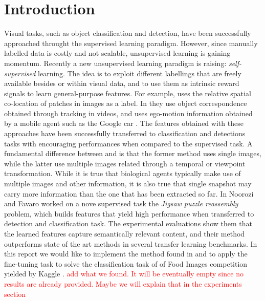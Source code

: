 \section{Introduction}
Visual tasks, such as object classification and detection, have been successfully approached throught the supervised learning paradigm. However, since manually labelled data is costly and not scalable, unsupervised learning is gaining momentum.\newline
Recently a new unsupervised learning paradigm is raising: \emph{self-supervised} learning. The idea is to exploit different labellings that are freely available besides or within visual data, and to use them as intrinsic reward signals to learn general-purpose features.
For example, \cite{context_prediction} uses the relative spatial co-location of patches in images as a label. In \cite{unsupervised_models_recognition} they use object correspondence obtained through tracking in videos, and \cite{learning_by_moving} uses ego-motion information obtained by a mobile agent such as the Google car \cite{landmark_identification}. The features obtained with these approaches have been successfully transferred to classification and detections tasks with encouraging performances when compared to the supervised task.\newline
A fundamental difference between \cite{context_prediction} and \cite{unsupervised_models_recognition} is that the former method uses single images, while the latter use multiple images related through a temporal or viewpoint transformation. While it is true that biological agents typically make use of multiple images and other information, it is also true that single snapshot may carry more information than the one that has been extracted so far. In \cite{Noroozi_2016} Noorozi and Favaro worked on a nove supervised task the \emph{Jigsaw puzzle reassembly} problem, which builds features that yield high performance when transferred to detection and classification task. The experimental evaluations show them that the learned features capture semantically relevant content, and their method outperforms state of the art methods in several transfer learning benchmarks.\newline
In this report we would like to implement the method found in \cite{Noroozi_2016} and to apply the fine-tuning task to solve the classification task of of Food Images \cite{food_images} competition yielded by Kaggle \cite{kaggle}. 
\textcolor{red}{add what we found. It will be eventually empty since no results are already provided. Maybe we will explain that in the experiments section}


